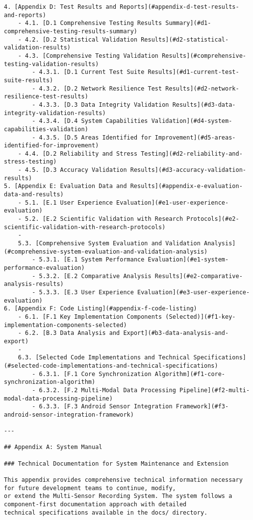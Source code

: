\documentclass[11pt,a4paper]{report}
\begin{document}
\begin{verbatim}
4. [Appendix D: Test Results and Reports](#appendix-d-test-results-and-reports)
    - 4.1. [D.1 Comprehensive Testing Results Summary](#d1-comprehensive-testing-results-summary)
    - 4.2. [D.2 Statistical Validation Results](#d2-statistical-validation-results)
    - 4.3. [Comprehensive Testing Validation Results](#comprehensive-testing-validation-results)
        - 4.3.1. [D.1 Current Test Suite Results](#d1-current-test-suite-results)
        - 4.3.2. [D.2 Network Resilience Test Results](#d2-network-resilience-test-results)
        - 4.3.3. [D.3 Data Integrity Validation Results](#d3-data-integrity-validation-results)
        - 4.3.4. [D.4 System Capabilities Validation](#d4-system-capabilities-validation)
        - 4.3.5. [D.5 Areas Identified for Improvement](#d5-areas-identified-for-improvement)
    - 4.4. [D.2 Reliability and Stress Testing](#d2-reliability-and-stress-testing)
    - 4.5. [D.3 Accuracy Validation Results](#d3-accuracy-validation-results)
5. [Appendix E: Evaluation Data and Results](#appendix-e-evaluation-data-and-results)
    - 5.1. [E.1 User Experience Evaluation](#e1-user-experience-evaluation)
    - 5.2. [E.2 Scientific Validation with Research Protocols](#e2-scientific-validation-with-research-protocols)
    -
    5.3. [Comprehensive System Evaluation and Validation Analysis](#comprehensive-system-evaluation-and-validation-analysis)
        - 5.3.1. [E.1 System Performance Evaluation](#e1-system-performance-evaluation)
        - 5.3.2. [E.2 Comparative Analysis Results](#e2-comparative-analysis-results)
        - 5.3.3. [E.3 User Experience Evaluation](#e3-user-experience-evaluation)
6. [Appendix F: Code Listing](#appendix-f-code-listing)
    - 6.1. [F.1 Key Implementation Components (Selected)](#f1-key-implementation-components-selected)
    - 6.2. [B.3 Data Analysis and Export](#b3-data-analysis-and-export)
    -
    6.3. [Selected Code Implementations and Technical Specifications](#selected-code-implementations-and-technical-specifications)
        - 6.3.1. [F.1 Core Synchronization Algorithm](#f1-core-synchronization-algorithm)
        - 6.3.2. [F.2 Multi-Modal Data Processing Pipeline](#f2-multi-modal-data-processing-pipeline)
        - 6.3.3. [F.3 Android Sensor Integration Framework](#f3-android-sensor-integration-framework)

---

## Appendix A: System Manual

### Technical Documentation for System Maintenance and Extension

This appendix provides comprehensive technical information necessary for future development teams to continue, modify,
or extend the Multi-Sensor Recording System. The system follows a component-first documentation approach with detailed
technical specifications available in the docs/ directory.


\end{verbatim}
\end{document}
